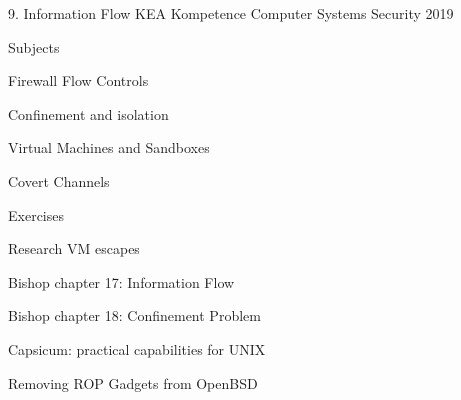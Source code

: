 \documentclass[Screen16to9,17pt]{foils}
\begin{document}
\mytitlepage
{9. Information Flow}
{KEA Kompetence Computer Systems Security 2019}



\begin{list1}
\item Subjects
\begin{list2}
\item Firewall Flow Controls
\item Confinement and isolation
\item Virtual Machines and Sandboxes
\item Covert Channels
\end{list2}
\item Exercises
\begin{list2}
\item Research VM escapes
\end{list2}
\end{list1}




\begin{list1}
\item Bishop chapter 17: Information Flow
\item Bishop chapter 18: Confinement Problem
\item Capsicum: practical capabilities for UNIX
\item Removing ROP Gadgets from OpenBSD
\end{list1}











\slidenext
\end{document}
